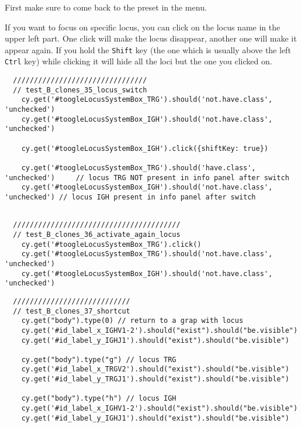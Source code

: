 First make sure to come back to the preset  in the  menu.

If you want to focus on specific locus, you can click on the locus name in
the upper left part. One click will make the locus disappear, another one will
make it appear again.
If you hold the \texttt{Shift} key (the one which is usually above the left
\texttt{Ctrl} key) while clicking it will hide all the loci but the one you
clicked on.

\begin{verbatim}
  ////////////////////////////////
  // test_B_clones_35_locus_switch
    cy.get('#toogleLocusSystemBox_TRG').should('not.have.class', 'unchecked')
    cy.get('#toogleLocusSystemBox_IGH').should('not.have.class', 'unchecked')

    cy.get('#toogleLocusSystemBox_IGH').click({shiftKey: true})

    cy.get('#toogleLocusSystemBox_TRG').should('have.class', 'unchecked')     // locus TRG NOT present in info panel after switch
    cy.get('#toogleLocusSystemBox_IGH').should('not.have.class', 'unchecked') // locus IGH present in info panel after switch


\end{verbatim}

\begin{verbatim}
  ////////////////////////////////////////
  // test_B_clones_36_activate_again_locus
    cy.get('#toogleLocusSystemBox_TRG').click()
    cy.get('#toogleLocusSystemBox_TRG').should('not.have.class', 'unchecked')
    cy.get('#toogleLocusSystemBox_IGH').should('not.have.class', 'unchecked')

\end{verbatim}

\begin{verbatim}
  ////////////////////////////
  // test_B_clones_37_shortcut
    cy.get("body").type(0) // return to a grap with locus 
    cy.get('#id_label_x_IGHV1-2').should("exist").should("be.visible")
    cy.get('#id_label_y_IGHJ1').should("exist").should("be.visible")

    cy.get("body").type("g") // locus TRG
    cy.get('#id_label_x_TRGV2').should("exist").should("be.visible")
    cy.get('#id_label_y_TRGJ1').should("exist").should("be.visible")

    cy.get("body").type("h") // locus IGH
    cy.get('#id_label_x_IGHV1-2').should("exist").should("be.visible")
    cy.get('#id_label_y_IGHJ1').should("exist").should("be.visible")


\end{verbatim}

